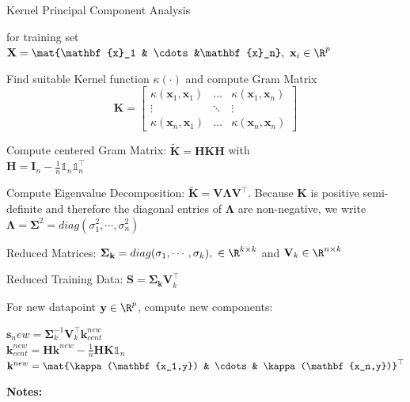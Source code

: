 \documentclass[english]{latex4ei/latex4ei_sheet}
\begin{document}
\begin{sectionbox}
\begin{cookbox}{Kernel Principal Component Analysis}
    \item  for training set $\mathbf{X}=\mat{\mathbf{x}_1 & \cdots &\mathbf{x}_n}, \ \mathbf{x}_i\in\R^p$
	\item Find suitable Kernel function $\kappa(\cdot)$ and compute Gram Matrix
	\[
    \mathbf{K}=
    \begin{bmatrix}
    \kappa(\mathbf{x}_1,\mathbf{x}_1) & \dots  & \kappa(\mathbf{x}_1,\mathbf{x}_n) \\
    \vdots & \ddots & \vdots \\
    \kappa(\mathbf{x}_n,\mathbf{x}_1) & \dots  & \kappa(\mathbf{x}_n,\mathbf{x}_n)
    \end{bmatrix}
    \]
	\item Compute centered Gram Matrix: $\mathbf{\tilde{K}=HKH}$ with\\ $\mathbf{H=I}_n-\frac{1}{n}\mathds{1}_n\mathds{1}_n^{\top}$
	\item Compute Eigenvalue Decomposition: $\mathbf{\tilde{K}=V\Lambda V^{\top}}$. Because $\mathbf{K}$ is positive semi-definite and therefore the diagonal entries of $\mathbf{\Lambda}$ are non-negative, we write $\mathbf{\Lambda=\Sigma}^2=diag(\sigma_1^2, \cdots, \sigma_n^2)$
	\item Reduced Matrices: $\mathbf{\Sigma_k}=diag(\sigma_1,\cdots,\sigma_k),\ \in\R^{k\times k}$ and $\mathbf{V}_k\in\R^{n\times k}$
	\item Reduced Training Data: $\mathbf{S=\Sigma_kV}_k^{\top}$
	\item For new datapoint $\mathbf{y}\in\R^p$, compute new components: 
	\begin{center}
		$\mathbf{s}_new=\mathbf{\Sigma}_k^{-1}\mathbf{V}_k^{\top}\mathbf{k}_{cent}^{new}$\\
	    $\mathbf{k}_{cent}^{new}=\mathbf{Hk}_{}^{new}-\frac{1}{n}\mathbf{HK}\mathds{1}_n$\\
		$\mathbf{k}^{new}=\mat{\kappa(\mathbf{x_1,y}) & \cdots & \kappa(\mathbf{x_n,y})}^{\top}$
	\end{center}
\end{cookbox}
\end{sectionbox}
\textbf{Notes:}

\newpage
\end{document}
